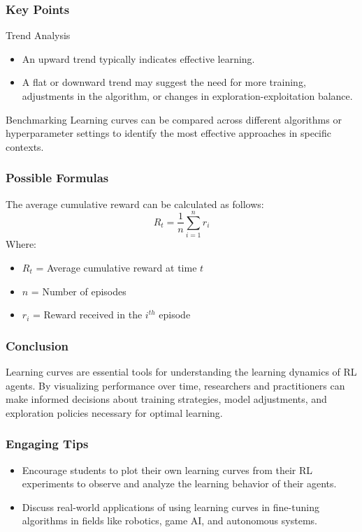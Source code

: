 \documentclass{beamer}
\begin{document}
\begin{frame}[fragile]
    \frametitle{Key Points}
    \begin{block}{Trend Analysis}
        \begin{itemize}
            \item An upward trend typically indicates effective learning.
            \item A flat or downward trend may suggest the need for more training, adjustments in the algorithm, or changes in exploration-exploitation balance.
        \end{itemize}
    \end{block}

    \begin{block}{Benchmarking}
        Learning curves can be compared across different algorithms or hyperparameter settings to identify the most effective approaches in specific contexts.
    \end{block}
\end{frame}

\begin{frame}[fragile]
    \frametitle{Possible Formulas}
    The average cumulative reward can be calculated as follows:
    \begin{equation}
        R_t = \frac{1}{n} \sum_{i=1}^{n} r_i
    \end{equation}
    Where:
    \begin{itemize}
        \item \( R_t \) = Average cumulative reward at time \( t \)
        \item \( n \) = Number of episodes
        \item \( r_i \) = Reward received in the \( i^{th} \) episode
    \end{itemize}
\end{frame}

\begin{frame}[fragile]
    \frametitle{Conclusion}
    Learning curves are essential tools for understanding the learning dynamics of RL agents. 
    By visualizing performance over time, researchers and practitioners can make informed decisions about training strategies, model adjustments, and exploration policies necessary for optimal learning.
\end{frame}

\begin{frame}[fragile]
    \frametitle{Engaging Tips}
    \begin{itemize}
        \item Encourage students to plot their own learning curves from their RL experiments to observe and analyze the learning behavior of their agents.
        \item Discuss real-world applications of using learning curves in fine-tuning algorithms in fields like robotics, game AI, and autonomous systems.
    \end{itemize}
\end{frame}
\end{document}

